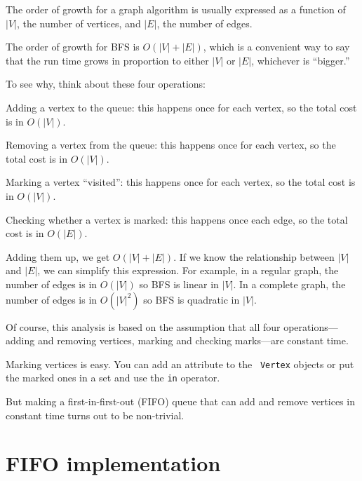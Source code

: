 \documentclass[10pt]{book}
\begin{document}
\newcommand{\V}{|V|}
\newcommand{\E}{|E|}

The order of growth for a graph algorithm is usually expressed
as a function of $\V$, the number of vertices, and $\E$, the number
of edges.

The order of growth for BFS is $O(\V + \E)$, which is a convenient
way to say that the run time grows in proportion to either $\V$ or
$\E$, whichever is ``bigger.''

To see why, think about these four operations:

\begin{description}

\item Adding a vertex to the queue: this happens once for each
vertex, so the total cost is in $O(\V)$.

\item Removing a vertex from the queue: this happens once for each
vertex, so the total cost is in $O(\V)$.

\item Marking a vertex ``visited'': this happens once for each
vertex, so the total cost is in $O(\V)$.

\item Checking whether a vertex is marked: this happens once each
edge, so the total cost is in $O(\E)$.

\end{description}

Adding them up, we get $O(\V + \E)$.  If we know the relationship
between $\V$ and $\E$, we can simplify this expression.  For
example, in a regular graph, the number of edges is in $O(\V)$ so BFS
is linear in $\V$.  In a complete graph, the number of edges is in
$O(\V^2)$ so BFS is quadratic in $\V$.

Of course, this analysis is based on the assumption that all four
operations---adding and removing vertices, marking and checking
marks---are constant time.

Marking vertices is easy.  You can add an attribute to the {\tt
  Vertex} objects or put the marked ones in a set and use
the {\tt in} operator.

But making a first-in-first-out (FIFO) queue that can add and remove
vertices in constant time turns out to be non-trivial.


\section{FIFO implementation}
\end{document}
